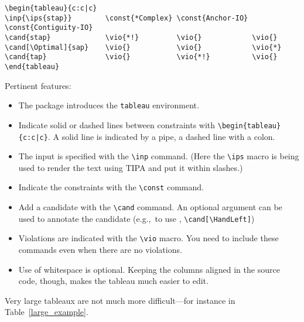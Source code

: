 \documentclass{article}
\def\eg{e.g.,~}
\begin{document}
\begin{verbatim}
\begin{tableau}{c:c|c}
\inp{\ips{stap}}        \const{*Complex} \const{Anchor-IO} \const{Contiguity-IO}
\cand{stap}             \vio{*!}         \vio{}            \vio{}
\cand[\Optimal]{sap}    \vio{}           \vio{}            \vio{*}
\cand{tap}              \vio{}           \vio{*!}          \vio{}
\end{tableau}
\end{verbatim}
Pertinent features:
\begin{itemize}
\item The package introduces the \verb+tableau+ environment.
\item Indicate solid or dashed lines between constraints with \verb+\begin{tableau}{c:c|c}+. A solid line is indicated by a pipe, a dashed line with a colon.
\item The input is specified with the \verb+\inp+ command. (Here the \verb+\ips+ macro is being used to render the text using TIPA and put it within slashes.)
\item Indicate the constraints with the \verb+\const+ command.
\item Add a candidate with the \verb+\cand+ command. An optional argument can be used to annotate the candidate (\eg to use \HandLeft, \verb+\cand[\HandLeft]+)
\item Violations are indicated with the \verb+\vio+ macro. You need to include these commands even when there are no violations.
\item Use of whitespace is optional. Keeping the columns aligned in the source code, though, makes the tableau much easier to edit.
\end{itemize}

\noindent Very large tableaux are not much more difficult---for instance in Table~\ref{large_example}.
\end{document}
